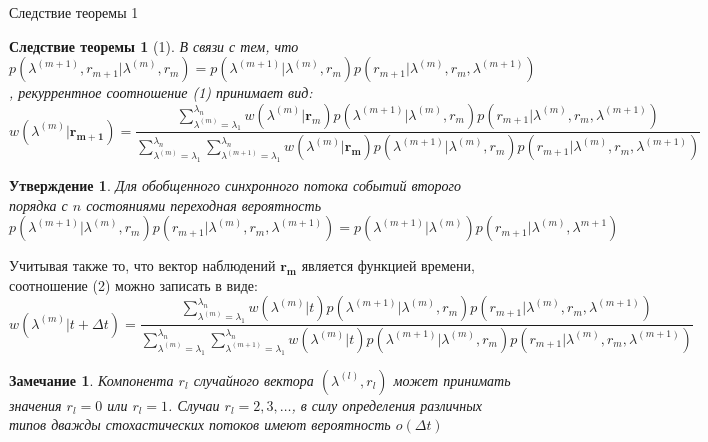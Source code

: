 \documentclass{beamer}
\newtheorem{consequence}{Следствие теоремы}
\newtheorem{statement}{Утверждение}
\newtheorem{remark}{Замечание}
\begin{document}
\begin{frame}{Следствие теоремы 1}
    \begin{consequence}[1]
В связи с тем, что \(p(\lambda^{(m+1)},r_{m+1}|\lambda^{(m)},r_m)=p(\lambda^{(m+1)}|\lambda^{(m)},r_m)p(r_{m+1}|\lambda^{(m)},r_m,\lambda^{(m+1)})\), рекуррентное соотношение (1) принимает вид:
\begin{equation}
    \scriptstyle w(\lambda^{(m)}|\boldsymbol{r_{m+1}})=\frac{\sum\limits_{\lambda^{(m)}=\lambda_1}^{\lambda_n}w(\lambda^{(m)}|\boldsymbol{r}_m)p(\lambda^{(m+1)}|\lambda^{(m)},r_m)p(r_{m+1}|\lambda^{(m)},r_m,\lambda^{(m+1)})}{\sum\limits_{\lambda^{(m)}=\lambda_1}^{\lambda_n}\sum\limits_{\lambda^{(m+1)}=\lambda_1}^{\lambda_n}w(\lambda^{(m)}|\boldsymbol{r_m})p(\lambda^{(m+1)}|\lambda^{(m)},r_m)p(r_{m+1}|\lambda^{(m)},r_m,\lambda^{(m+1)})}
\end{equation}
\end{consequence}
\end{frame}

\begin{frame}
    \begin{statement}
    Для обобщенного синхронного потока событий второго порядка с \(n\) состояниями переходная вероятность \(\scriptstyle p(\lambda^{(m+1)}|\lambda^{(m)},r_m)p(r_{m+1}|\lambda^{(m)},r_m,\lambda^{(m+1)})=p(\lambda^{(m+1)}|\lambda^{(m)})p(r_{m+1}|\lambda^{(m)},\lambda^{m+1})\)
    \end{statement}

    Учитывая также то, что вектор наблюдений \(\boldsymbol{r_{m}}\) является функцией времени, соотношение (2) можно записать в виде:
    \begin{equation}
        \scriptstyle w(\lambda^{(m)}|t+\Delta t)=\frac{\sum\limits_{\lambda^{(m)}=\lambda_1}^{\lambda_n}w(\lambda^{(m)}|t)p(\lambda^{(m+1)}|\lambda^{(m)},r_m)p(r_{m+1}|\lambda^{(m)},r_m,\lambda^{(m+1)})}{\sum\limits_{\lambda^{(m)}=\lambda_1}^{\lambda_n}\sum\limits_{\lambda^{(m+1)}=\lambda_1}^{\lambda_n}w(\lambda^{(m)}|t)p(\lambda^{(m+1)}|\lambda^{(m)},r_m)p(r_{m+1}|\lambda^{(m)},r_m,\lambda^{(m+1)})}
    \end{equation}
    \begin{remark}
        Компонента \(r_l\) случайного вектора \((\lambda^{(l)},r_l)\) может принимать значения \(r_l=0\) или \(r_l=1\). Случаи \(r_l=2,3,\dots\), в силу определения различных типов дважды стохастических потоков имеют вероятность \(o(\Delta t)\)
    \end{remark}
\end{frame}
\end{document}

